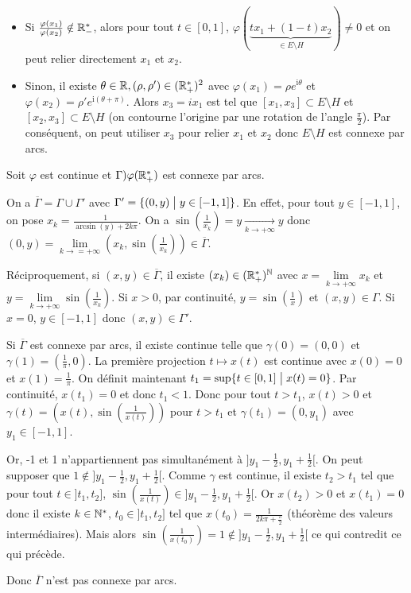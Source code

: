 \begin{solution}
\begin{enumerate}
		\begin{itemize}
			\item Si $\frac{\varphi(x_{1})}{\varphi(x_{2})}\notin\mathbb{R}_{-}^{*}$, alors pour tout $t\in[0,1]$, $\varphi(\underbrace{tx_{1}+(1-t)x_{2}}_{\in E\setminus H})\neq0$ et on peut relier directement $x_{1}$ et $x_{2}$.
			\item Sinon, il existe $\theta\in\mathbb{R},(\rho,\rho')\in(\mathbb{R}_{+}^{*})^{2}$ avec $\varphi(x_{1})=\rho e^{\mathrm{i}\theta}$ et $\varphi(x_{2})=\rho'e^{\mathrm{i}(\theta+\pi)}$. Alors $x_{3}=ix_{1}$ est tel que $[x_{1},x_{3}]\subset E\setminus H$ et $[x_{2},x_{3}]\subset E\setminus H$ (on contourne l'origine par une rotation de l'angle $\frac{\pi}{2}$). Par conséquent, on peut utiliser $x_{3}$ pour relier $x_{1}$ et $x_{2}$ donc $E\setminus H$ est connexe par arcs.
		\end{itemize}
	\end{enumerate}
\end{solution}

\begin{solution}
	Soit 
	$\varphi$ est continue et $\Gamma)\varphi(\mathbb{R}_{+}^{*})$ est connexe par arcs.

	On a $\overline{\Gamma}=\Gamma\cup\Gamma'$ avec $\Gamma'=\{(0,y)\bigm| y\in[-1,1]\}$. En effet, pour tout $y\in[-1,1]$, on pose $x_{k}=\frac{1}{\arcsin(y)+2k\pi}$. On a $\sin(\frac{1}{x_{k}})=y\xrightarrow[k\to+\infty]{}y$ donc $(0,y)=\lim\limits_{k\to=+\infty}(x_{k},\sin(\frac{1}{x_{k}}))\in\overline{\Gamma}$.

	Réciproquement, si $(x,y)\in\overline{\Gamma}$, il existe $(x_{k})\in(\mathbb{R}_{+}^{*})^{\mathbb{N}}$ avec $x=\lim\limits_{k\to+\infty}x_{k}$ et $y=\lim\limits_{k\to+\infty}\sin(\frac{1}{x_{k}})$. Si $x>0$, par continuité, $y=\sin(\frac{1}{x})$ et $(x,y)\in\Gamma$. Si $x=0$, $y\in[-1,1]$ donc $(x,y)\in\Gamma'$.

	Si $\overline{\Gamma}$ est connexe par arcs, il existe 
	continue telle que $\gamma(0)=(0,0)$ et $\gamma(1)=(\frac{1}{\pi},0)$. La première projection $t\mapsto x(t)$ est continue avec $x(0)=0$ et $x(1)=\frac{1}{\pi}$. On définit maintenant $t_{1}=\sup\{t\in[0,1]\bigm| x(t)=0\}$. Par continuité, $x(t_{1})=0$ et donc $t_{1}<1$. Donc pour tout $t>t_{1}$, $x(t)>0$ et $\gamma(t)=(x(t),\sin(\frac{1}{x(t)}))$ pour $t>t_{1}$ et $\gamma(t_{1})=(0,y_{1})$ avec $y_{1}\in[-1,1]$.

	Or, -1 et 1 n'appartiennent pas simultanément à $]y_{1}-\frac{1}{2},y_{1}+\frac{1}{2}[$. On peut supposer que $1\notin]y_{1}-\frac{1}{2},y_{1}+\frac{1}{2}[$. Comme $\gamma$ est continue, il existe $t_{2}>t_{1}$ tel que pour tout $t\in]t_{1},t_{2}]$, $\sin(\frac{1}{x(t)})\in]y_{1}-\frac{1}{2},y_{1}+\frac{1}{2}[$. Or $x(t_{2})>0$ et $x(t_{1})=0$ donc il existe $k\in\mathbb{N}^{*}$, $t_{0}\in]t_{1},t_{2}]$ tel que $x(t_{0})=\frac{1}{2k\pi+\frac{\pi}{2}}$ (théorème des valeurs intermédiaires). Mais alors $\sin(\frac{1}{x(t_{0})})=1\notin]y_{1}-\frac{1}{2},y_{1}+\frac{1}{2}[$ ce qui contredit ce qui précède.

	Donc $\overline{\Gamma}$ n'est pas connexe par arcs.
\end{solution}

